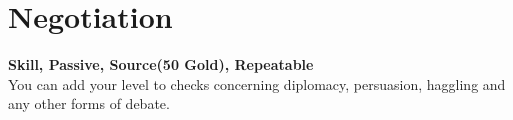 \section{Negotiation}\label{sec:negotiation}
\textbf{Skill, Passive, Source(50 Gold), Repeatable}\\
You can add your level to checks concerning diplomacy, persuasion, haggling and any other forms of debate. 